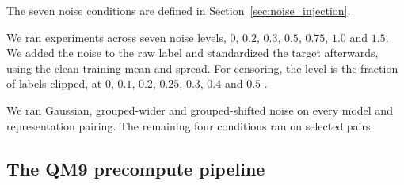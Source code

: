 The seven noise conditions are defined in Section~\ref{sec:noise_injection}.

We ran experiments across seven noise levels, $0$, $0.2$, $0.3$, $0.5$, $0.75$, $1.0$ and $1.5$. We added the noise to the raw label and standardized the target afterwards, using the clean training mean and spread. For censoring, the level is the fraction of labels clipped, at $0$, $0.1$, $0.2$, $0.25$, $0.3$, $0.4$ and $0.5$ \citep{Svensson2025}.

We ran Gaussian, grouped-wider and grouped-shifted noise on every model and representation pairing. The
remaining four conditions ran on selected pairs. 


\subsection{The QM9 precompute pipeline}

